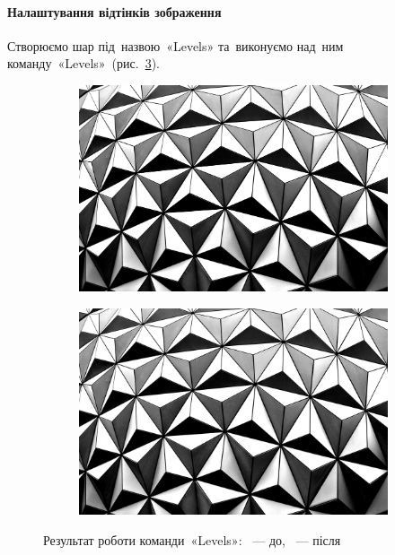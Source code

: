 \documentclass[
	a4paper,
	oneside,
	BCOR = 10mm,
	DIV = 12,
	12pt,
	headings = normal,
]{scrartcl}
\begin{document}
		\paragraph{Налаштування відтінків зображення}
			Створюємо шар під~назвою~\textenglish{«Levels»} та~виконуємо над~ним команду~\textenglish{«Levels»}~(рис.~\ref{fig:02-levels}).
			\begin{figure}[!htbp]
				\centering
				\begin{subfigure}{0.5\columnwidth}
					\centering
					\includegraphics[height = 6\baselineskip]{./assets/abstract-abstract-photo-art-1070345.jpg}
					\caption{}
					\label{subfig:02-01-levels}
				\end{subfigure}%
				\begin{subfigure}{0.5\columnwidth}
					\centering
					\includegraphics[height = 6\baselineskip]{./assets/y03s01-multimedia-lab-01-p01-02-levels.jpg}
					\caption{}
					\label{subfig:02-02-levels}
				\end{subfigure}%
				\caption{Результат роботи команди~\textenglish{«Levels»}: ~— до, ~— після}
				\label{fig:02-levels}
			\end{figure}
\end{document}
